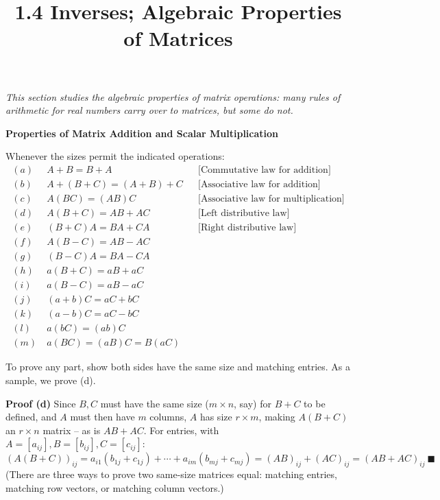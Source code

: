 \documentclass{article}
\title{1.4 Inverses; Algebraic Properties of Matrices}
\date{}
\author{}
\newcommand{\redheading}[1]{{\vspace{2mm}\noindent\Large\bfseries\color{red!55!black} #1\par}\vspace{2mm}}
\theoremstyle{mystyle}
\begin{document}
\maketitle

{\itshape\color{blue!45!black}
This section studies the algebraic properties of matrix operations: many rules of arithmetic for real numbers carry over to matrices, but some do not.\par}

\redheading{Properties of Matrix Addition and Scalar Multiplication}

\begin{tcolorbox}[colback=red!4, colframe=red!60!black, title=Theorem 1.4.1 -- Properties of Matrix Arithmetic, boxrule=0.5mm, arc=3mm]
Whenever the sizes permit the indicated operations:
\begin{align*}
(a)&\ A+B=B+A &&\text{[Commutative law for addition]}\\
(b)&\ A+(B+C)=(A+B)+C &&\text{[Associative law for addition]}\\
(c)&\ A(BC)=(AB)C &&\text{[Associative law for multiplication]}\\
(d)&\ A(B+C)=AB+AC &&\text{[Left distributive law]}\\
(e)&\ (B+C)A=BA+CA &&\text{[Right distributive law]}\\
(f)&\ A(B-C)=AB-AC\\
(g)&\ (B-C)A=BA-CA\\
(h)&\ a(B+C)=aB+aC\\
(i)&\ a(B-C)=aB-aC\\
(j)&\ (a+b)C=aC+bC\\
(k)&\ (a-b)C=aC-bC\\
(l)&\ a(bC)=(ab)C\\
(m)&\ a(BC)=(aB)C=B(aC)
\end{align*}
\end{tcolorbox}

To prove any part, show both sides have the same size and matching entries. As a sample, we prove (d).

\textbf{Proof (d)} Since $B,C$ must have the same size ($m\times n$, say) for $B+C$ to be defined, and $A$ must then have $m$ columns, $A$ has size $r\times m$, making $A(B+C)$ an $r\times n$ matrix -- as is $AB+AC$. For entries, with $A=[a_{ij}],B=[b_{ij}],C=[c_{ij}]$:
\[
(A(B+C))_{ij}=a_{i1}(b_{1j}+c_{1j})+\cdots+a_{im}(b_{mj}+c_{mj})=(AB)_{ij}+(AC)_{ij}=(AB+AC)_{ij}\ \blacksquare
\]
(There are three ways to prove two same-size matrices equal: matching entries, matching row vectors, or matching column vectors.)
\end{document}
